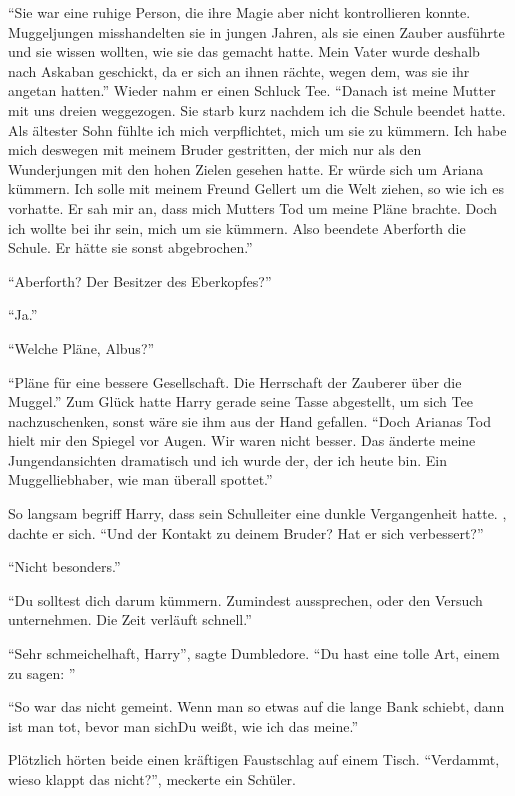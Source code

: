 \enquote{Sie war eine ruhige Person, die ihre Magie aber nicht kontrollieren konnte. Muggeljungen misshandelten sie in jungen Jahren, als sie einen Zauber ausführte und sie wissen wollten, wie sie das gemacht hatte. Mein Vater wurde deshalb nach Askaban geschickt, da er sich an ihnen rächte, wegen dem, was sie ihr angetan hatten.} Wieder nahm er einen Schluck Tee. \enquote{Danach ist meine Mutter mit uns dreien weggezogen. Sie starb kurz nachdem ich die Schule beendet hatte. Als ältester Sohn fühlte ich mich verpflichtet, mich um sie zu kümmern. Ich habe mich deswegen mit meinem Bruder gestritten, der mich nur als den Wunderjungen mit den hohen Zielen gesehen hatte. Er würde sich um Ariana kümmern. Ich solle mit meinem Freund Gellert um die Welt ziehen, so wie ich es vorhatte. Er sah mir an, dass mich Mutters Tod um meine Pläne brachte. Doch ich wollte bei ihr sein, mich um sie kümmern. Also beendete Aberforth die Schule. Er hätte sie sonst abgebrochen.}

\enquote{Aberforth? Der Besitzer des Eberkopfes?}

\enquote{Ja.}

\enquote{Welche Pläne, Albus?}

\enquote{Pläne für eine bessere Gesellschaft. Die Herrschaft der Zauberer über die Muggel.} Zum Glück hatte Harry gerade seine Tasse abgestellt, um sich Tee nachzuschenken, sonst wäre sie ihm aus der Hand gefallen. \enquote{Doch Arianas Tod hielt mir den Spiegel vor Augen. Wir waren nicht besser. Das änderte meine Jungendansichten dramatisch und ich wurde der, der ich heute bin. Ein Muggelliebhaber, wie man überall spottet.}

So langsam begriff Harry, dass sein Schulleiter eine dunkle Vergangenheit hatte. , dachte er sich. \enquote{Und der Kontakt zu deinem Bruder? Hat er sich verbessert?}

\enquote{Nicht besonders.}

\enquote{Du solltest dich darum kümmern. Zumindest aussprechen, oder den Versuch unternehmen. Die Zeit verläuft schnell.}

\enquote{Sehr schmeichelhaft, Harry}, sagte Dumbledore. \enquote{Du hast eine tolle Art, einem zu sagen: }

\enquote{So war das nicht gemeint. Wenn man so etwas auf die lange Bank schiebt, dann ist man tot, bevor man sich\abs Du weißt, wie ich das meine.}

Plötzlich hörten beide einen kräftigen Faustschlag auf einem Tisch. \enquote{Verdammt, wieso klappt das nicht?}, meckerte ein Schüler.

